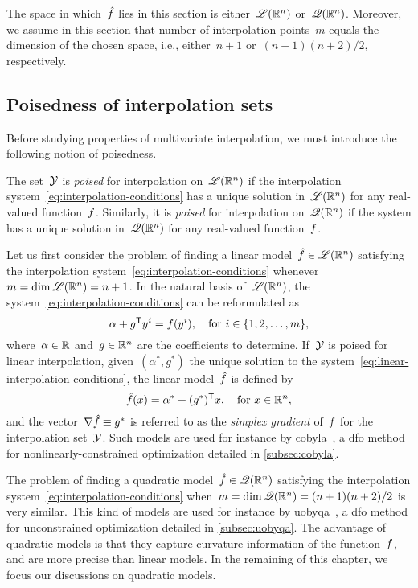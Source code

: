 The space in which~$\objm$ lies in this section is either~$\mathscr{L}(\mathbb{R}^n)$ or~$\mathscr{Q}(\mathbb{R}^n)$.
Moreover, we assume in this section that number of interpolation points~$m$ equals the dimension of the chosen space, i.e., either~$n + 1$ or~$(n + 1)(n + 2) / 2$, respectively.

\subsection{Poisedness of interpolation sets}

Before studying properties of multivariate interpolation, we must introduce the following notion of poisedness.

\begin{definition}[Poisedness]
    The set~$\xpt$ is \emph{poised} for interpolation on~$\mathscr{L}(\mathbb{R}^n)$ if the interpolation system~\cref{eq:interpolation-conditions} has a unique solution in~$\mathscr{L}(\mathbb{R}^n)$ for any real-valued function~$f$.
    Similarly, it is \emph{poised} for interpolation on~$\mathscr{Q}(\mathbb{R}^n)$ if the system has a unique solution in~$\mathscr{Q}(\mathbb{R}^n)$ for any real-valued function~$f$.
\end{definition}

Let us first consider the problem of finding a linear model~$\objm \in \lpoly$ satisfying the interpolation system~\cref{eq:interpolation-conditions} whenever~$m = \dim \mathscr{L}(\mathbb{R}^n) = n + 1$.
In the natural basis of~$\mathscr{L}(\mathbb{R}^n)$, the system~\cref{eq:interpolation-conditions} can be reformulated as
\begin{equation}
    \label{eq:linear-interpolation-conditions}
    \alpha + g^{\mathsf{T}} y^i = f(y^i), \quad \text{for~$i \in \{1, 2, \dots, m\}$},
\end{equation}
where~$\alpha \in \mathbb{R}$ and~$g \in \mathbb{R}^n$ are the coefficients to determine.
If~$\xpt$ is poised for linear interpolation, given~$(\alpha^{\ast}, g^{\ast})$ the unique solution to the system~\cref{eq:linear-interpolation-conditions}, the linear model~$\objm$ is defined by
\begin{equation*}
    \objm(\iter) = \alpha^{\ast} + (g^{\ast})^{\T} x, \quad \text{for~$\iter \in \R^n$},
\end{equation*}
and the vector~$\nabla \objm \equiv g^{\ast}$ is referred to as the \emph{simplex gradient} of~$f$ for the interpolation set~$\xpt$.
Such models are used for instance by \gls{cobyla}~\cite{Powell_1994}, a \gls{dfo} method for nonlinearly-constrained optimization detailed in \cref{subsec:cobyla}.

The problem of finding a quadratic model~$\objm \in \qpoly$ satisfying the interpolation system~\cref{eq:interpolation-conditions} when~$m = \dim \mathscr{Q}(\mathbb{R}^n) = (n + 1)(n + 2) / 2$ is very similar.
This kind of models are used for instance by \gls{uobyqa}~\cite{Powell_2002}, a \gls{dfo} method for unconstrained optimization detailed in \cref{subsec:uobyqa}.
The advantage of quadratic models is that they capture curvature information of the function~$f$, and are more precise than linear models.
In the remaining of this chapter, we focus our discussions on quadratic models.

